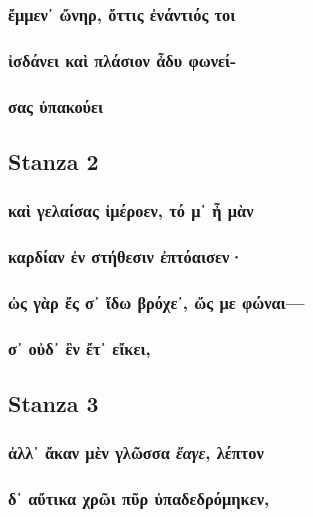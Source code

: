 \subsubsection*{ἔμμεν᾽ ὤνηρ, ὄττις ἐνάντιός τοι}

\subsubsection*{ἰσδάνει καὶ πλάσιον ἆδυ φωνεί-}

\subsubsection*{σας ὐπακούει}

\subsection*{Stanza 2}
\subsubsection*{καὶ γελαίσας ἰμέροεν, τό μ᾽ ἦ μὰν}

\subsubsection*{καρδίαν ἐν στήθεσιν ἐπτόαισεν·}

\subsubsection*{ὠς γὰρ ἔς σ᾽ ἴδω βρόχε᾽, ὤς με φώναι---}

\subsubsection*{σ᾽ οὐδ᾽ ἒν ἔτ᾽ εἴκει,}

\subsection*{Stanza 3}
\subsubsection*{ἀλλ᾽ ἄκαν μὲν γλῶσσα \emph{ἔαγε}, λέπτον}

\subsubsection*{δ᾽ αὔτικα χρῶι πῦρ ὐπαδεδρόμηκεν,}

